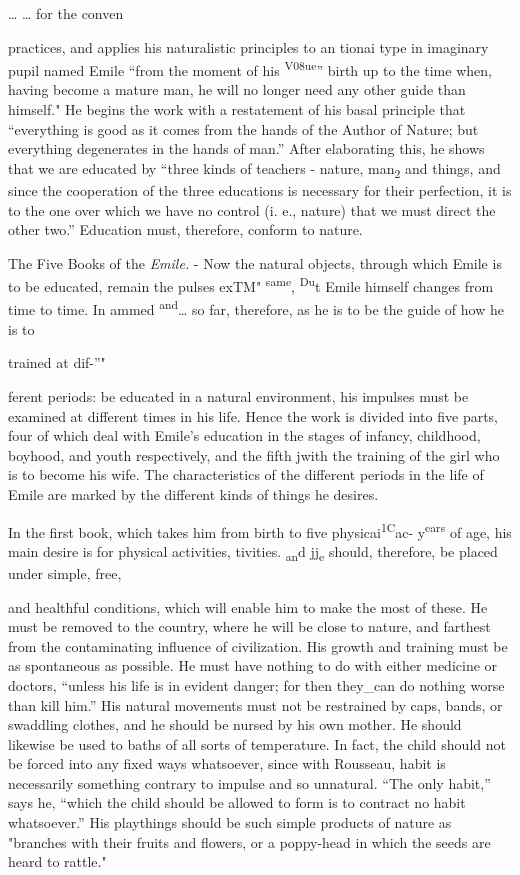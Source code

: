 \documentclass[]{book}
\begin{document}
\ldots{} \ldots{} for the conven

practices, and applies his naturalistic principles to an tionai type in imaginary pupil named Emile ``from the moment of his \textsuperscript{V08ue}'' birth up to the time when, having become a mature man, he will no longer need any other guide than himself." He begins the work with a restatement of his basal principle that ``everything is good as it comes from the hands of the Author of Nature; but everything degenerates in the hands of man.'' After elaborating this, he shows that we are educated by ``three kinds of teachers - nature, man\textsubscript{2} and things, and since the cooperation of the three educations is necessary for their perfection, it is to the one over which we have no control (i. e., nature) that we must direct the other two.'' Education must, therefore, conform to nature.

The Five Books of the \emph{Emile.} - Now the natural objects, through which Emile is to be educated, remain the\protect\hypertarget{ch19.xmlux5cux23para.269.1.0.box.70.233.1261.94.q.50}{}{ pulses exTM" \textsuperscript{same}, \textsuperscript{Du}t Emile himself changes from time to time. In ammed \textsuperscript{and}\ldots{} so far, therefore, as he is to be the guide of how he is to}

trained at dif-''"

ferent periods: be educated in a natural environment, his impulses must be examined at different times in his life. Hence the work is divided into five parts, four of which deal with Emile's education in the stages of infancy, childhood, boyhood, and youth respectively, and the fifth jwith the training of the girl who is to become his wife. The characteristics of the different periods in the life of Emile are marked by the different kinds of things he desires.

In the first book, which takes him from birth to five physicai\textsuperscript{1C}ac- y\textsuperscript{ears} of age, his main desire is for physical activities, tivities. \textsubscript{an}d jj\textsubscript{e} should, therefore, be placed under simple, free,

and healthful conditions, which will enable him to make the most of these. He must be removed to the country, where he will be close to nature, and farthest from the contaminating influence of civilization. His growth and training must be as spontaneous as possible. He must have nothing to do with either medicine or doctors, ``unless his life is in evident danger; for then they\_can do nothing worse than kill him.'' His natural movements must not be restrained by caps, bands, or swaddling clothes, and he should be nursed by his own mother. He should likewise be used to baths of all sorts of temperature. In fact, the child should not be forced into any fixed ways whatsoever, since with Rousseau, habit is necessarily something contrary to impulse and so unnatural. ``The only habit,'' says he, ``which the child should be allowed to form is to contract no habit whatsoever.'' His playthings should be such simple products of nature as "branches with their fruits and flowers, or a\protect\hypertarget{ch19.xmlux5cux23para.270.1.0.box.138.224.1053.42.q.70}{}{ poppy-head in which the seeds are heard to rattle."}
\end{document}
